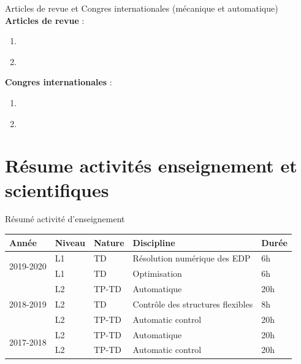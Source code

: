 \documentclass[aspectratio=169, french]{beamer}
\begin{document}
\begin{frame}{Articles de revue et Congres internationales (mécanique et automatique)}
	\textbf{Articles de revue} : 
	\begin{enumerate}
		\item \cite{brugnoli2021ther}
		\item \cite{brugnoli2020msd}
	\end{enumerate}
	\textbf{Congres internationales} :
	\begin{enumerate}
		\item \cite{brugnoli2019cdc}
		\item \cite{cardoso2019cdc}
	\end{enumerate}
\end{frame}

\section{Résume activités enseignement et scientifiques}

\begin{frame}{Résumé activité d'enseignement}
	\begin{table}
		\centering
		\begin{tabular}{p{}p{}p{}p{}p{}}
			\hline
			Année & Niveau & Nature  & Discipline & Durée  \\
			\hline
			\multirow{2}{*}{2019-2020} & L1 & TD &  Résolution numérique des EDP & 6h \\
			& L1 & TD &  Optimisation & 6h \\
			\hline
			\multirow{3}{*}{2018-2019} & L2  & TP-TD  & Automatique & 20h \\
			& L2  & TD     & Contrôle des structures flexibles & 8h \\
			& L2  & TP-TD  & Automatic control & 20h \\
			\hline
			\multirow{2}{*}{2017-2018} & L2  & TP-TD  & Automatique & 20h \\
			& L2  & TP-TD  & Automatic control & 20h \\				   
			\hline
		\end{tabular}


	\end{table}
\end{frame}
\end{document}
